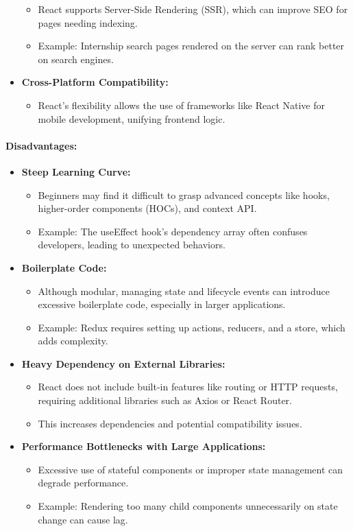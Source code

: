 \begin{itemize}
    \begin{itemize}
        \item React supports Server-Side Rendering (SSR), which can improve SEO for pages needing indexing.
        \item Example: Internship search pages rendered on the server can rank better on search engines.
    \end{itemize}
    \item \textbf{Cross-Platform Compatibility:}
    \begin{itemize}
        \item React’s flexibility allows the use of frameworks like React Native for mobile development, unifying frontend logic.
    \end{itemize}
\end{itemize}

\paragraph{Disadvantages:}
\begin{itemize}
    \item \textbf{Steep Learning Curve:}
    \begin{itemize}
        \item Beginners may find it difficult to grasp advanced concepts like hooks, higher-order components (HOCs), and context API.
        \item Example: The useEffect hook’s dependency array often confuses developers, leading to unexpected behaviors.
    \end{itemize}
    \item \textbf{Boilerplate Code:}
    \begin{itemize}
        \item Although modular, managing state and lifecycle events can introduce excessive boilerplate code, especially in larger applications.
        \item Example: Redux requires setting up actions, reducers, and a store, which adds complexity.
    \end{itemize}
    \item \textbf{Heavy Dependency on External Libraries:}
    \begin{itemize}
        \item React does not include built-in features like routing or HTTP requests, requiring additional libraries such as Axios or React Router.
        \item This increases dependencies and potential compatibility issues.
    \end{itemize}
    \item \textbf{Performance Bottlenecks with Large Applications:}
    \begin{itemize}
        \item Excessive use of stateful components or improper state management can degrade performance.
        \item Example: Rendering too many child components unnecessarily on state change can cause lag.
    \end{itemize}
\end{itemize}

